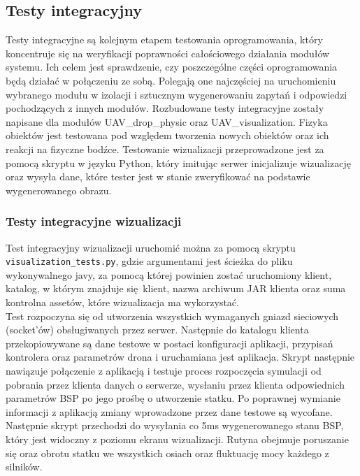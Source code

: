 \documentclass[15pt]{sprawozdanie}
\begin{document}
\subsection{Testy integracyjny}

Testy integracyjne są kolejnym etapem testowania oprogramowania, który koncentruje się na weryfikacji poprawności całościowego działania modułów systemu. Ich celem jest sprawdzenie, czy poszczególne części oprogramowania będą działać w połączeniu ze sobą. Polegają one najczęściej na uruchomieniu wybranego modułu w izolacji i sztucznym wygenerowaniu zapytań i odpowiedzi pochodzących z innych modułów. Rozbudowane testy integracyjne zostały napisane dla modułów UAV\_drop\_physic oraz UAV\_visualization. Fizyka obiektów jest testowana pod względem tworzenia nowych obiektów oraz ich reakcji na fizyczne bodźce. Testowanie wizualizacji przeprowadzone jest za pomocą skryptu w języku Python, który imitując serwer inicjalizuje wizualizację oraz wysyła dane, które tester jest w stanie zweryfikować na podstawie wygenerowanego obrazu.

\subsubsection{Testy integracyjne wizualizacji}

Test integracyjny wizualizacji uruchomić można za pomocą skryptu \\ \texttt{visualization\_tests.py}, gdzie argumentami jest ścieżka do pliku wykonywalnego javy, za pomocą której powinien zostać uruchomiony klient, katalog, w którym znajduje się klient, nazwa archiwum JAR klienta oraz suma kontrolna assetów, które wizualizacja ma wykorzystać. \\


Test rozpoczyna się od utworzenia wszystkich wymaganych gniazd sieciowych (socket'ów) obsługiwanych przez serwer. Następnie do katalogu klienta przekopiowywane są dane testowe w postaci konfiguracji aplikacji, przypisań kontrolera oraz parametrów drona i uruchamiana jest aplikacja. Skrypt następnie nawiązuje połączenie z aplikacją i testuje proces rozpoczęcia symulacji od pobrania przez klienta danych o serwerze, wysłaniu przez klienta odpowiednich parametrów BSP po jego prośbę o utworzenie statku. Po poprawnej wymianie informacji z aplikacją zmiany wprowadzone przez dane testowe są wycofane. Następnie skrypt przechodzi do wysyłania co 5ms wygenerowanego stanu BSP, który jest widoczny z poziomu ekranu wizualizacji. Rutyna obejmuje poruszanie się oraz obrotu statku we wszystkich osiach oraz fluktuację mocy każdego z silników.  
\end{document}
